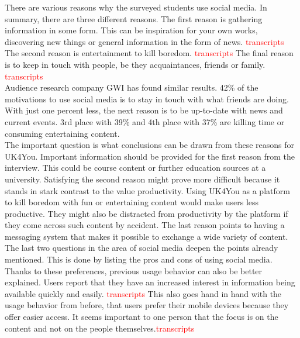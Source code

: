 There are various reasons why the surveyed students use social media.
In summary, there are three different reasons.
The first reason is gathering information in some form.
This can be inspiration for your own works, discovering new things or general information in the form of news. \textcolor{red}{transcripts}
The second reason is entertainment to kill boredom. \textcolor{red}{transcripts}
The final reason is to keep in touch with people, be they acquaintances, friends or family. \textcolor{red}{transcripts} \\

Audience research company GWI has found similar results\cite{gwi-top-10-reasons}.
42\% of the motivations to use social media is to stay in touch with what friends are doing.
With just one percent less, the next reason is to be up-to-date with news and current events.
3rd place with 39\% and 4th place with 37\% are killing time or consuming entertaining content.\\

The important question is what conclusions can be drawn from these reasons for UK4You.
Important information should be provided for the first reason from the interview.
This could be course content or further education sources at a university.
Satisfying the second reason might prove more difficult because it stands in stark contrast to the value productivity.
Using UK4You as a platform to kill boredom with fun or entertaining content would make users less productive.
They might also be distracted from productivity by the platform if they come across such content by accident.
The last reason points to having a messaging system that makes it possible to exchange a wide variety of content.\\

The last two questions in the area of social media deepen the points already mentioned.
This is done by listing the pros and cons of using social media.
Thanks to these preferences, previous usage behavior can also be better explained.
Users report that they have an increased interest in information being available quickly and easily. \textcolor{red}{transcripts}
This also goes hand in hand with the usage behavior from before, that users prefer their mobile devices because they offer easier access.
It seems important to one person that the focus is on the content and not on the people themselves.\textcolor{red}{transcripts}\\

